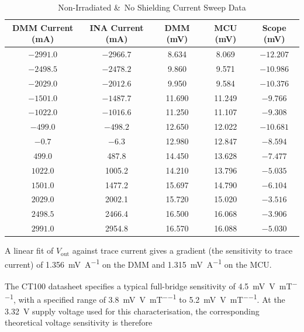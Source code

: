 \documentclass[12pt,a4paper]{article}
\begin{document}
\begin{table}[H]
    \centering
    \small 
    \caption{Non-Irradiated \&\ No Shielding Current Sweep Data}
    \label{tab:sensitivity-unirr-full}
    \begin{tabular}{@{}ccccc@{}}
        \toprule
        DMM Current (mA) & INA Current (mA) & DMM (mV) & MCU (mV) & Scope (mV) \\
        \midrule
        \(-2991.0\) & \(-2966.7\) & 8.634 & 8.069 & \(-12.207\) \\
        \(-2498.5\) & \(-2478.2\) & 9.860 & 9.571 & \(-10.986\) \\
        \(-2029.0\) & \(-2012.6\) & 9.950 & 9.584 & \(-10.376\) \\
        \(-1501.0\) & \(-1487.7\) & 11.690 & 11.249 & \(-9.766\) \\
        \(-1022.0\) & \(-1016.6\) & 11.250 & 11.107 & \(-9.308\) \\
        \(-499.0\) & \(-498.2\) & 12.650 & 12.022 & \(-10.681\) \\
        \(-0.7\) & \(-6.3\) & 12.980 & 12.847 & \(-8.594\) \\
        $499.0$ & 487.8 & 14.450 & 13.628 & \(-7.477\) \\
        $1022.0$ & 1005.2 & 14.210 & 13.796 & \(-5.035\) \\
        $1501.0$ & 1477.2 & 15.697 & 14.790 & \(-6.104\) \\
        $2029.0$ & 2002.1 & 15.720 & 15.020 & \(-3.516\) \\
        $2498.5$ & 2466.4 & 16.500 & 16.068 & \(-3.906\) \\
        $2991.0$ & 2954.8 & 16.570 & 16.088 & \(-5.030\) \\
        \bottomrule
    \end{tabular}
\end{table}

A linear fit of $V_{\text{out}}$ against trace current gives a gradient (the sensitivity to trace current) of
\SI{1.356}{\milli\volt\per\ampere} on the DMM and
\SI{1.315}{\milli\volt\per\ampere} on the MCU.

The CT100 datasheet \cite{ct100_datasheet} specifies a typical full-bridge sensitivity of
\SI{4.5}{\milli\volt\per\volt\per\milli\tesla}, with a specified range of
\SI{3.8}{\milli\volt\per\volt\per\milli\tesla} to
\SI{5.2}{\milli\volt\per\volt\per\milli\tesla}. At the
\SI{3.32}{\volt} supply voltage used for this characterisation, the
corresponding theoretical voltage sensitivity is therefore
\end{document}
